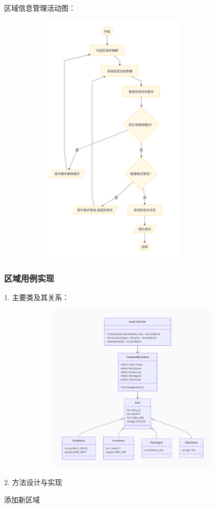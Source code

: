 \documentclass[]{article}
\let\oldincludegraphics\includegraphics
\renewcommand{\includegraphics}[2][]{%
  \begin{center}\oldincludegraphics[#1]{#2}\end{center}%
}
\begin{document}
区域信息管理活动图：

\includegraphics[width=4.45694in,height=4.83819in]{media/media/image_2-3-3.png}

\hypertarget{ux7528ux4f8b-1ux5b9eux73b0}{%
  \subsubsection{区域用例实现}\label{ux7528ux4f8b-1ux5b9eux73b0}}
1. 主要类及其关系：
\includegraphics[width=6.06528in,height=3.22222in]{media/media/image_2-3-4.png}

2. 方法设计与实现

添加新区域
\end{document}
